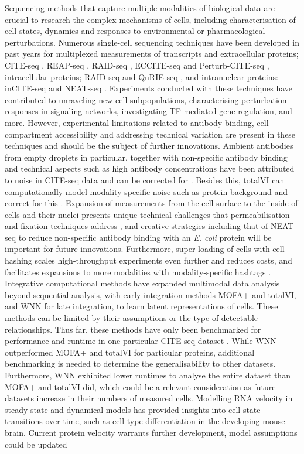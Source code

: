 \documentclass[times, twoside, watermark]{zHenriquesLab-StyleBioRxiv}
\begin{document}
Sequencing methods that capture multiple modalities of biological data are crucial to research the complex mechanisms of cells, including characterisation of cell states, dynamics and responses to environmental or pharmacological perturbations. Numerous single-cell sequencing techniques have been developed in past years for multiplexed measurements of transcripts and extracellular proteins; CITE-seq \cite{Stoeckius2017}, REAP-seq \cite{Peterson2017}, RAID-seq \cite{Gerlach2019}, ECCITE-seq \cite{Mimitou2019} and Perturb-CITE-seq \cite{Frangieh2021}, intracellular proteins; RAID-seq \cite{Gerlach2019} and QuRIE-seq \cite{Rivello2020}, and intranuclear proteins: inCITE-seq \cite{Chung2021} and NEAT-seq \cite{Chen2021}. Experiments conducted with these techniques have contributed to unraveling new cell subpopulations, characterising perturbation responses in signaling networks, investigating TF-mediated gene regulation, and more. However, experimental limitations related to antibody binding, cell compartment accessibility and addressing technical variation are present in these techniques and should be the subject of further innovations. Ambient antibodies from empty droplets in particular, together with non-specific antibody binding and technical aspects such as high antibody concentrations have been attributed to noise in CITE-seq data and can be corrected for \cite{Mule2020,Buus2021}. Besides this, totalVI can computationally model modality-specific noise such as protein background and correct for this \cite{Gayoso2021}. Expansion of measurements from the cell surface to the inside of cells and their nuclei presents unique technical challenges that permeabilisation and fixation techniques address \cite{Gerlach2019,Rivello2020,Chung2021,Chen2021}, and creative strategies including that of NEAT-seq to reduce non-specific antibody binding with an \textit{E. coli} protein will be important for future innovations. Furthermore, super-loading of cells with cell hashing \cite{Stoeckius2018} scales high-throughput experiments even further and reduces costs, and facilitates expansions to more modalities with modality-specific hashtags \cite{Mimitou2019}. \newline Integrative computational methods have expanded multimodal data analysis beyond sequential analysis, with early integration methods MOFA+ and totalVI, and WNN for late integration, to learn latent representations of cells. These methods can be limited by their assumptions or the type of detectable relationships. Thus far, these methods have only been benchmarked for performance and runtime in one particular CITE-seq dataset \cite{Hao2021}. While WNN outperformed MOFA+ and totalVI for particular proteins, additional benchmarking is needed to determine the generalisability to other datasets. Furthermore, WNN exhibited lower runtimes to analyse the entire dataset than MOFA+ and totalVI did, which could be a relevant consideration as future datasets increase in their numbers of measured cells. Modelling RNA velocity in steady-state and dynamical models has provided insights into cell state transitions over time, such as cell type differentiation in the developing mouse brain. Current protein velocity warrants further development, model assumptions could be updated 
\end{document}

